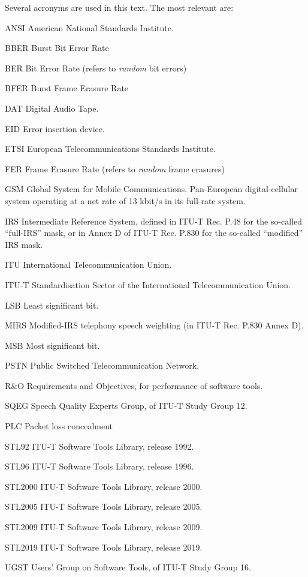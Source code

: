 Several acronyms are used in this text. The most relevant are:
\begin{Descr}{20mm}
\item[ANSI]  American National Standards Institute.
\item[BBER]  Burst Bit Error Rate
\item[BER]   Bit Error Rate (refers to {\em random} bit errors)
\item[BFER]  Burst Frame Erasure Rate
\item[DAT]   Digital Audio Tape.
\item[EID]   Error insertion device.
\item[ETSI]  European Telecommunications Standards Institute.
\item[FER]   Frame Erasure Rate (refers to {\em random} frame erasures)
\item[GSM]   Global System for Mobile Communications. Pan-European
             digital-cellular system operating at a net rate of 13
             kbit/s in its full-rate system.
\item[IRS]   Intermediate Reference System, defined in ITU-T Rec. P.48
             for the so-called ``full-IRS'' mask, or in Annex D of ITU-T
             Rec. P.830 for the so-called ``modified'' IRS mask.
\item[ITU]   International Telecommunication Union.
\item[ITU-T] Standardisation Sector of the International
             Telecommunication Union.
\item[LSB]   Least significant bit.
\item[MIRS]  Modified-IRS telephony speech weighting (in ITU-T Rec. P.830 Annex D).
\item[MSB]   Most significant bit.
\item[PSTN]  Public Switched Telecommunication Network.
\item[R\&O]  Requirements and Objectives, for performance of software tools.
\item[SQEG]  Speech Quality Experts Group, of ITU-T Study Group 12.
\item[PLC]   Packet loss concealment
\item[STL92] ITU-T Software Tools Library, release 1992.
\item[STL96] ITU-T Software Tools Library, release 1996.
\item[STL2000] ITU-T Software Tools Library, release 2000.
\item[STL2005] ITU-T Software Tools Library, release 2005.
\item[STL2009] ITU-T Software Tools Library, release 2009.
\item[STL2019] ITU-T Software Tools Library, release 2019.
\item[UGST]  Users' Group on Software Tools, of ITU-T Study Group 16.
\end{Descr}


